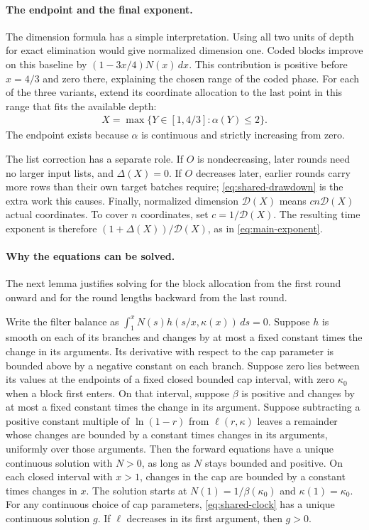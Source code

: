 \documentclass[runningheads,envcountsame,envcountsect,orivec]{llncs}
\begin{document}
\paragraph{The endpoint and the final exponent.}
The dimension formula has a simple interpretation. Using all
two units of depth for exact elimination would give normalized
dimension one. Coded blocks improve on this baseline by
$(1-3x/4)N(x)\,dx$. This contribution is positive before
$x=4/3$ and zero there, explaining the chosen range of the
coded phase. For each of the three variants, extend its
coordinate allocation to the last point in this range that
fits the available depth:
\begin{align}
 X=\max\{Y\in[1,4/3]:\alpha(Y)\le2\}.
 \label{eq:shared-endpoint}
\end{align}
The endpoint exists because $\alpha$ is continuous and
strictly increasing from zero.

The list correction has a separate role. If $O$ is
nondecreasing, later rounds need no larger input lists,
and $\Delta(X)=0$. If $O$ decreases later, earlier rounds
carry more rows than their own target batches require;
\eqref{eq:shared-drawdown} is the extra work this causes.
Finally, normalized dimension $\mathcal D(X)$ means
$cn\mathcal D(X)$ actual coordinates. To cover $n$
coordinates, set $c=1/\mathcal D(X)$.
The resulting time exponent is therefore
$(1+\Delta(X))/\mathcal D(X)$, as in
\eqref{eq:main-exponent}.

\paragraph{Why the equations can be solved.}
The next lemma justifies solving for the block allocation from
the first round onward and for the round lengths backward from
the last round.

\begin{lemma}
\label{lem:volterra-flow}
Write the filter balance as
$\int_1^x N(s)h(s/x,\kappa(x))\,ds=0$.
Suppose $h$ is smooth on each of its branches and changes by
at most a fixed constant times the change in its arguments.
Its derivative with respect to the cap parameter is bounded above
by a negative constant on each branch. Suppose zero lies between its values at the endpoints of a fixed
closed bounded cap interval, with zero
$\kappa_0$ when a block first enters. On that interval, suppose
$\beta$ is positive and changes by at most a fixed constant times
the change in its argument. Suppose subtracting a positive
constant multiple of $\ln(1-r)$ from $\ell(r,\kappa)$ leaves
a remainder whose changes are bounded by a constant times changes
in its arguments, uniformly over those arguments. Then the forward equations have a unique continuous
solution with $N>0$, as long as $N$ stays bounded and positive.
On each closed interval with $x>1$, changes in the cap are bounded
by a constant times changes in $x$.
The solution starts at $N(1)=1/\beta(\kappa_0)$ and
$\kappa(1)=\kappa_0$. For any continuous choice of cap parameters,
\eqref{eq:shared-clock} has a unique continuous solution $g$.
If $\ell$ decreases in its first argument, then $g>0$.
\end{lemma}
\end{document}
